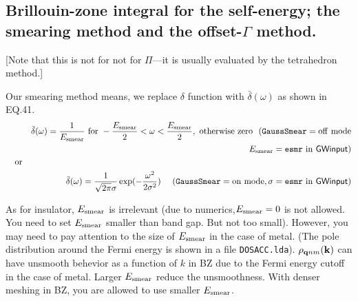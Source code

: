 \documentclass[a4paper,10pt,epsf,fleqn]{article}
\newcommand{\io}[1]{{\sf  #1}}
\newcommand{\raw}[1]{{\tt #1}}
\begin{document}
\newpage
\subsection{Brillouin-zone integral for the self-energy; 
the smearing method and the offset-$\Gamma$ method.}
\label{kint}

[Note that this is not for not for $\Pi$---it is usually evaluated by the tetrahedron method.]

Our smearing method means, we replace $\delta$ function with $\bar{\delta}(\omega)$ as shown in EQ.41. 
\setlength{\mathindent}{-5mm}
\begin{eqnarray}
&&\bar{\delta}(\omega) = \frac{1}{E_{\rm smear}} 
{\rm \ for \ } -\frac{E_{\rm smear}}{2}<\omega <\frac{E_{\rm smear}}{2}, {\rm \  otherwise \ zero \ \ ({\tt GaussSmear}=off \ mode} \nonumber \\
&& \hspace{7cm} \ E_{\rm smear} = \raw{esmr} \ {\rm in} \ \io{GWinput})\\
\nonumber {\rm \ \ \ or} \\
&&\bar{\delta}(\omega) = \frac{1}{\sqrt{2 \pi} \sigma} \exp( -\frac{\omega^2}{2 \sigma^2}) \ \ \ {\rm \  ({\tt GaussSmear}=on \ mode, \sigma = \raw{esmr} \ in \ \io{GWinput})} \nonumber
\end{eqnarray}
\setlength{\mathindent}{0mm}

As for insulator, $E_{\rm smear}$ is irrelevant
(due to numerics,$E_{\rm smear}=0$ is not allowed. 
You need to set $E_{\rm smear}$ smaller than band gap. 
But not too small).
However, you may need to pay attention to the size of 
$E_{\rm smear}$ in the case of metal.
(The pole distribution around the Fermi energy 
is shown in a file {\tt DOSACC.lda}).
$\rho_{{\bf q}nm}({\bf k})$ can have unsmooth behevior 
as a function of $k$ in BZ due to the Fermi energy cutoff 
in the case of metal.
Larger $E_{\rm smear}$ reduce the unsmoothness.
With denser meshing in BZ, you are allowed to use smaller $E_{\rm smear}$.\\
\end{document}
